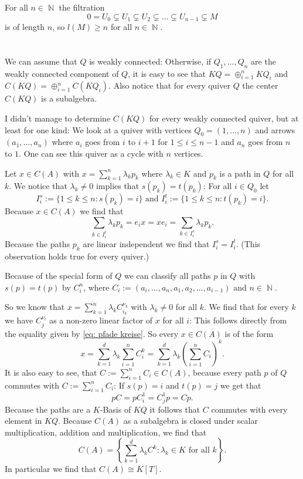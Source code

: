 \documentclass[a4paper,10pt]{article}
\theoremstyle{definition}
\newcommand{\N}{\operatorname{\mathbb{N}}}
\begin{document}
For all $n \in \N$ the filtration
\[
 0 = U_0 \subsetneq U_1 \subsetneq U_2 \subsetneq \ldots \subsetneq U_{n-1} \subsetneq M
\]
is of length $n$, so $l(M) \geq n$ for all $n \in \N$.



\section{}
We can assume that $Q$ is weakly connected: Otherwise, if $Q_1, \ldots, Q_n$ are the weakly connected component of $Q$, it is easy to see that $KQ = \oplus_{i=1}^n KQ_i$ and $C(KQ) = \oplus_{i=1}^n C(KQ_i)$. Also notice that for every quiver $Q$ the center $C(KQ)$ is a subalgebra.

I didn't manage to determine $C(KQ)$ for every weakly connected quiver, but at least for one kind: We look at a quiver with vertices $Q_0 = (1, \ldots, n)$ and arrows $(a_1, \ldots, a_n)$ where $a_i$ goes from $i$ to $i+1$ for $1 \leq i \leq n-1$ and $a_n$ goes from $n$ to $1$. One can see this quiver as a cycle with $n$ vertices.

Let $x \in C(A)$ with $x = \sum_{k=1}^n \lambda_k p_k$ where $\lambda_k \in K$ and $p_k$ is a path in $Q$ for all $k$. We notice that $\lambda_k \neq 0$ implies that $s(p_k) = t(p_k)$: For all $i \in Q_0$ let
\[
 I^s_i := \{1 \leq k \leq n : s(p_k)=i\} \text{ and } I^t_i := \{1 \leq k \leq n : t(p_k)=i\}.
\] Because $x \in C(A)$ we find that
\begin{equation}\label{eq: pfade kreise}
 \sum_{k \in I^t_i} \lambda_k p_k = e_i x = x e_i = \sum_{k \in I^s_i} \lambda_k p_k.
\end{equation}
Because the paths $p_k$ are linear independent we find that $I^s_i = I^t_i$. (This observation holds true for every quiver.)

Because of the special form of $Q$ we can classify all paths $p$ in $Q$ with $s(p) = t(p)$ by $C^n_i$, where $C_i := (a_i, \ldots, a_n, a_1, a_2, \ldots, a_{i-1})$ and $n \in \N$.

So we know that $x = \sum_{k=1}^n \lambda_k C^{\nu_k}_{i_k}$ with $\lambda_k \neq 0$ for all $k$. We find that for every $k$ we have $C_j^{\nu_i}$ as a non-zero linear factor of $x$ for all $i$: This follows directly from the equality given by \eqref{eq: pfade kreise}.
So every $x \in C(A)$ is of the form
\begin{equation*}\label{eq: looks like polynomial}
 x
 = \sum_{k=1}^d \lambda_k \sum_{i=1}^n C_i^k
 = \sum_{k=1}^d \lambda_k \left( \sum_{i=1}^n C_i \right)^k.
\end{equation*}
It is also easy to see, that $C := \sum_{i=1}^n C_i \in C(A)$, because every path $p$ of $Q$ commutes with $C := \sum_{i=1}^n C_i$: If $s(p)=i$ and $t(p)=j$ we get that
\[
 pC = p C^1_i = C^1_j p = Cp.
\]
Because the paths are a $K$-Basis of $KQ$ it follows that $C$ commutes with every element in $KQ$.
Because $C(A)$ as a subalgebra is closed under scalar multiplication, addition and multiplication, we find that
\[
 C(A) = \left\{ \sum_{k=1}^d \lambda_k C^k : \lambda_k \in K \text{ for all } k\right\}.
\]
In particular we find that $C(A) \cong K[T]$.
\end{document}
